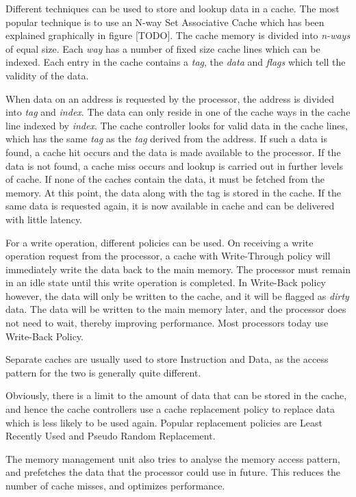 Different techniques can be used to store and lookup data in a cache. The most popular technique is to use an N-way Set Associative Cache which has been explained graphically in figure [TODO]. The cache memory is divided into \textit{n-ways} of equal size. Each \textit{way} has a number of fixed size cache lines which can be indexed. Each entry in the cache contains a \textit{tag}, the \textit{data} and \textit{flags} which tell the validity of the data.

When data on an address is requested by the processor, the address is divided into \textit{tag} and \textit{index}. The data can only reside in one of the cache ways in the cache line indexed by \textit{index}. The cache controller looks for valid data in the cache lines, which has the same \textit{tag} as the \textit{tag} derived from the address. If such a data is found, a cache hit occurs and the data is made available to the processor. If the data is not found, a cache miss occurs and lookup is carried out in further levels of cache. If none of the caches contain the data, it must be fetched from the memory. At this point, the data along with the tag is stored in the cache. If the same data is requested again, it is now available in cache and can be delivered with little latency.

For a write operation, different policies can be used. On receiving a write operation request from the processor, a cache with Write-Through policy will immediately write the data back to the main memory. The processor must remain in an idle state until this write operation is completed. In Write-Back policy however, the data will only be written to the cache, and it will be flagged as \textit{dirty} data. The data will be written to the main memory later, and the processor does not need to wait, thereby improving performance. Most processors today use Write-Back Policy.

Separate caches are usually used to store Instruction and Data, as the access pattern for the two is generally quite different. 

Obviously, there is a limit to the amount of data that can be stored in the cache, and hence the cache controllers use a cache replacement policy to replace data which is less likely to be used again. Popular replacement policies are Least Recently Used and Pseudo Random Replacement.

The memory management unit also tries to analyse the memory access pattern, and prefetches the data that the processor could use in future. This reduces the number of cache misses, and optimizes performance.

